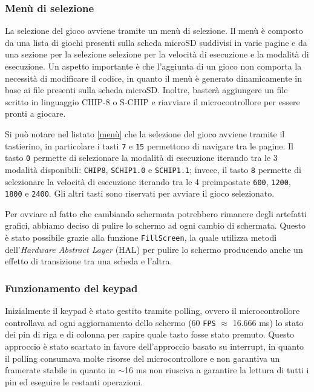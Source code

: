 \documentclass[a4paper]{article}
\begin{document}
\subsubsection{Menù di selezione}

La selezione del gioco avviene tramite un menù di selezione. Il menù è composto da una lista
di giochi presenti sulla scheda microSD suddivisi in varie pagine e da una sezione per la
selezione selezione per la velocità di esecuzione e la modalità di esecuzione. Un aspetto
importante è che l'aggiunta di un gioco non comporta la necessità di modificare il codice,
in quanto il menù è generato dinamicamente in base ai file presenti sulla scheda microSD.
Inoltre, basterà aggiungere un file scritto in linguaggio CHIP-8 o S-CHIP e riavviare il
microcontrollore per essere pronti a giocare.

Si può notare nel listato \ref{menù} che la selezione del gioco avviene tramite il tastierino,
in particolare i tasti \texttt{7} e \texttt{15} permettono di navigare tra le pagine. Il tasto
\texttt{0} permette di selezionare la modalità di esecuzione iterando tra le 3 modalità
disponibili: \texttt{CHIP8}, \texttt{SCHIP1.0} e \texttt{SCHIP1.1}; invece, il tasto \texttt{8}
permette di selezionare la velocità di esecuzione iterando tra le 4 preimpostate
\texttt{600}, \texttt{1200}, \texttt{1800} e \texttt{2400}. Gli altri tasti sono riservati per
avviare il gioco selezionato.

Per ovviare al fatto che cambiando schermata potrebbero rimanere degli artefatti grafici, abbiamo
deciso di pulire lo schermo ad ogni cambio di schermata. Questo è stato possibile grazie alla
funzione \texttt{FillScreen}, la quale utilizza metodi dell'\textit{Hardware Abstract Layer} (HAL)
per pulire lo schermo producendo anche un effetto di transizione tra una scheda e l'altra.

\subsubsection{Funzionamento del keypad}\label{subsubsec:keypad}

Inizialmente il keypad è stato gestito tramite polling, ovvero il microcontrollore controllava
ad ogni aggiornamento dello schermo (60 \texttt{FPS} $\approx$ 16.666 ms) lo stato dei pin di riga
e di colonna per capire quale tasto fosse stato premuto. Questo approccio è stato scartato in
favore dell'approccio basato su interrupt, in quanto il polling consumava molte risorse del
microcontrollore e non garantiva un framerate stabile in quanto in $\sim$16 ms non riusciva a
garantire la lettura di tutti i pin ed eseguire le restanti operazioni.
\end{document}
